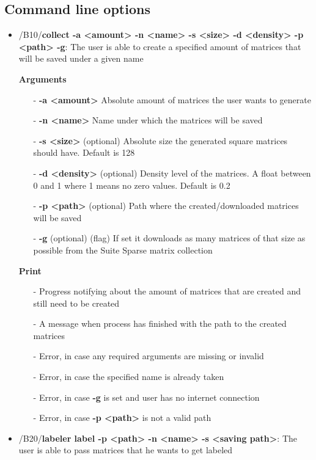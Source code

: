 \documentclass[parskip=full]{scrartcl}
\begin{document}
\subsection{Command line options}
\begin{itemize}
\item/B10/\textbf{collect -a <amount> -n <name> -s <size> -d <density> -p <path> -g}:
\newline The user is able to create a specified amount of matrices that will be saved under a given name

\textbf{Arguments}
	\begin{itemize}
	\item[-]\textbf{-a <amount>} Absolute amount of matrices the user wants to generate
	\item[-]\textbf{-n <name>} Name under which the matrices will be saved
	\item[-]\textbf{-s <size>} (optional) Absolute size the generated square matrices should have. Default is 128
	\item[-]\textbf{-d <density>} (optional) Density level of the matrices. A float between 0 and 1 where 1 means no zero values. Default is 0.2
	\item[-]\textbf{-p <path>} (optional) Path where the created/downloaded matrices will be saved
	\item[-]\textbf{-g} (optional) (flag) If set it downloads as many matrices of that size as possible from the \gls{Suite Sparse} matrix collection
	\end{itemize}

\textbf{Print}
	\begin{itemize}
	\item[-]Progress notifying about the amount of matrices that are created and still need to be created
	\item[-]A message when process has finished with the path to the created matrices
	\item[-]Error, in case any required arguments are missing or invalid
	\item[-]Error, in case the specified name is already taken
	\item[-]Error, in case \textbf{-g} is set and user has no internet connection
	\item[-]Error, in case \textbf{-p <path>} is not a valid path
	\end{itemize}

\item/B20/\textbf{labeler label -p <path> -n <name> -s <saving path>}:
\newline The user is able to pass matrices that he wants to get labeled


\end{itemize}
\end{document}
